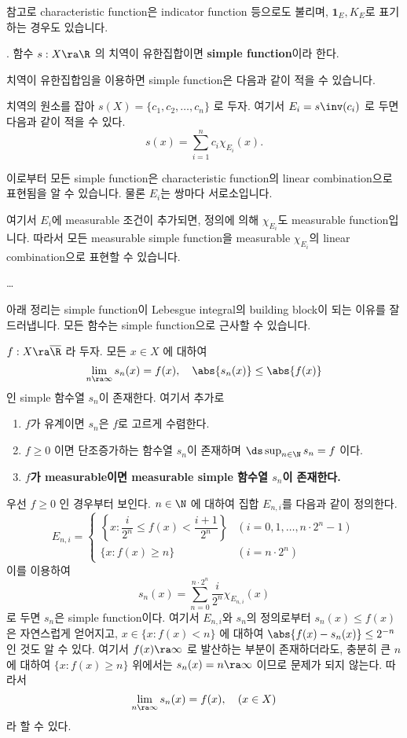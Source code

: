 참고로 characteristic function은 indicator function 등으로도 불리며, \(\mathbf{1}_E, K_E\)로 표기하는 경우도 있습니다.

.  함수 \(s: X\ra\R\) 의 치역이 유한집합이면 \textbf{simple function}이라 한다.

치역이 유한집합임을 이용하면 simple function은 다음과 같이 적을 수 있습니다.

\rmk 치역의 원소를 잡아 \(s(X) = \{c_1, c_2, \dots, c_n\}\) 로 두자. 여기서 \(E_i = s\inv(c_i)\) 로 두면 다음과 같이 적을 수 있다.
\[
    s(x) = \sum_{i=1}^{n} c_i \chi_{E_i}(x).
\]

이로부터 모든 simple function은 characteristic function의 linear combination으로 표현됨을 알 수 있습니다. 물론 \(E_i\)는 쌍마다 서로소입니다.

여기서 \(E_i\)에 measurable 조건이 추가되면, 정의에 의해 \(\chi_{E_i}\)도 measurable function입니다. 따라서 모든 measurable simple function을 measurable \(\chi_{E_i}\)의 linear combination으로 표현할 수 있습니다.

\dots

아래 정리는 simple function이 Lebesgue integral의 building block이 되는 이유를 잘 드러냅니다. 모든 함수는 simple function으로 근사할 수 있습니다.

 \(f : X \ra \overline{\R}\) 라 두자. 모든 \(x \in X\) 에 대하여
\[
    \lim_{n \ra \infty} s_n(x) = f(x), \quad \abs{s_n(x)} \leq \abs{f(x)}
\]
인 simple 함수열 \(s_n\)이 존재한다. 여기서 추가로
\begin{enumerate}
    \item \(f\)가 유계이면 \(s_n\)은 \(f\)로 고르게 수렴한다.
    \item \(f\geq 0\) 이면 단조증가하는 함수열 \(s_n\)이 존재하며 \(\ds \sup_{n\in \N} s_n = f\) 이다.
    \item \textbf{\(f\)가 measurable이면 measurable simple 함수열 \(s_n\)이 존재한다.}
\end{enumerate}

\pf 우선 \(f \geq 0\) 인 경우부터 보인다. \(n \in \N\) 에 대하여 집합 \(E_{n, i}\)를 다음과 같이 정의한다.
\[
    E_{n, i} = \begin{cases}
        \left\{x : \dfrac{i}{2^n} \leq f(x) < \dfrac{i+1}{2^n}\right\} & (i = 0, 1, \dots, n\cdot 2^n - 1) \\
        \{x : f(x) \geq n\}                                            & (i = n\cdot 2^n)
    \end{cases}
\]
이를 이용하여
\[
    s_n(x) = \sum_{n=0}^{n\cdot 2^n} \frac{i}{2^n} \chi_{E_{n, i}} (x)
\]
로 두면 \(s_n\)은 simple function이다. 여기서 \(E_{n, i}\)와 \(s_n\)의 정의로부터 \(s_n(x) \leq f(x)\) 은 자연스럽게 얻어지고, \(x \in \{x : f(x) < n\}\) 에 대하여 \(\abs{f(x) - s_n(x)} \leq 2^{-n}\) 인 것도 알 수 있다. 여기서 \(f(x) \ra \infty\) 로 발산하는 부분이 존재하더라도, 충분히 큰 \(n\)에 대하여 \(\{x : f(x) \geq n\}\) 위에서는 \(s_n(x) = n \ra \infty\) 이므로 문제가 되지 않는다. 따라서
\[
    \lim_{n \ra \infty} s_n(x) = f(x), \quad (x \in X)
\]
라 할 수 있다.

